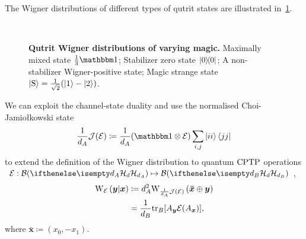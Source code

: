 \documentclass[pra,
aps,
twocolumn,
superscriptaddress,
groupedaddress,
nofootinbib,
reprint
]{revtex4-1}
\begin{document}
The Wigner distributions of different types of qutrit states are illustrated in~\cref{fig:wstate_examples}.
\begin{figure}%
    \centering
    \hspace{8pt}%
    \\
    \hspace{8pt}%
    \caption{\textbf{Qutrit Wigner distributions of varying magic.} 
     Maximally mixed state $\frac{1}{3}\id$;  Stabilizer zero state $\ketbra{0}{0}$;  A non-stabilizer Wigner-positive state;  Magic strange state $\ket{{\rm{S}}} = \frac{1}{\sqrt{2}}(\ket{1} - \ket{2})$.
    }%
    \label{fig:wstate_examples}
\end{figure}

We can exploit the channel-state duality and use the normalised Choi-Jamio\l{}kowski state 
\begin{equation}\label{eq:cj}
    \frac{1}{d_A}\J(\E) \coloneqq \frac{1}{d_A}(\id \otimes \E) \sum_{i,j} \ket{ii}\bra{jj}
\end{equation}
to extend the definition of the Wigner distribution to quantum ${\rm{CPTP}}$ operations $\E: \cal{B}(\hd[d_A]) \mapsto \cal{B}(\hd[d_B])$, 
\begin{align}\label{eq:woperation}
    \W[\bmy|\bmx]{\E} 
    &\coloneqq d_A^2 \W[\bm{\bar x} \oplus \bmy]{\frac{1}{d_A}\J(\E)} \\
    &= \frac{1}{d_B} \tr_B[A_{\bmy} \E(A_{\bmx})],
\end{align}
where $\bm{\bar x} \coloneqq (x_0, -x_1)$.
\end{document}
